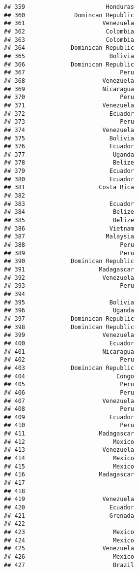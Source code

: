 \documentclass[
]{article}
\begin{document}
\begin{verbatim}
## 359                       Honduras
## 360              Domincan Republic
## 361                      Venezuela
## 362                       Colombia
## 363                       Colombia
## 364             Dominican Republic
## 365                        Bolivia
## 366             Dominican Republic
## 367                           Peru
## 368                      Venezuela
## 369                      Nicaragua
## 370                           Peru
## 371                      Venezuela
## 372                        Ecuador
## 373                           Peru
## 374                      Venezuela
## 375                        Bolivia
## 376                        Ecuador
## 377                         Uganda
## 378                         Belize
## 379                        Ecuador
## 380                        Ecuador
## 381                     Costa Rica
## 382                               
## 383                        Ecuador
## 384                         Belize
## 385                         Belize
## 386                        Vietnam
## 387                       Malaysia
## 388                           Peru
## 389                           Peru
## 390             Dominican Republic
## 391                     Madagascar
## 392                      Venezuela
## 393                           Peru
## 394                               
## 395                        Bolivia
## 396                         Uganda
## 397             Dominican Republic
## 398             Dominican Republic
## 399                      Venezuela
## 400                        Ecuador
## 401                      Nicaragua
## 402                           Peru
## 403             Dominican Republic
## 404                          Congo
## 405                           Peru
## 406                           Peru
## 407                      Venezuela
## 408                           Peru
## 409                        Ecuador
## 410                           Peru
## 411                     Madagascar
## 412                         Mexico
## 413                      Venezuela
## 414                         Mexico
## 415                         Mexico
## 416                     Madagascar
## 417                               
## 418                               
## 419                      Venezuela
## 420                        Ecuador
## 421                        Grenada
## 422                               
## 423                         Mexico
## 424                         Mexico
## 425                      Venezuela
## 426                         Mexico
## 427                         Brazil

\end{verbatim}
\end{document}
